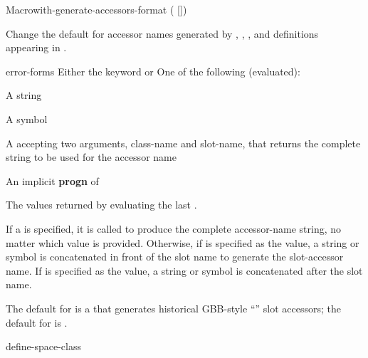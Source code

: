 \documentclass[10pt,twoside,english,pdftex]{article}
\begin{document}
\begin{functiondoc}{Macro}{with-generate-accessors-format}%
  {( [])
    \superstar{} \returns{}
    \superstar{}}

\fnsyntax

\fnpurpose Change the default for accessor names generated by
\textbf{}, \textbf{},
\textbf{}, and
\textbf{} definitions appearing in .

\fnpackage {}

\fnmodule {}

\fnargs
\begin{args}{error-forms}
\arg[format] Either the keyword  or 
 One of the following (evaluated):
\begin{tightitemize}
\item A string 
\item A symbol
\item A  accepting two arguments, class-name and slot-name,
  that returns the complete string to be used for the accessor name
\end{tightitemize}
\arg[forms] An implicit \textbf{progn} of 
\end{args}

\fnreturns The values returned by evaluating the last .

\fndescription If a   is
specified, it is called to produce the complete accessor-name string, no
matter which  value is provided.  Otherwise, if 
is specified as the  value, a string or symbol
 is concatenated in front of the slot name to
generate the slot-accessor name.  If  is specified as the
 value, a string or symbol  is
concatenated after the slot name.

The default  for  is a
 that generates historical GBB-style
``'' slot accessors; the default for
 is .

\begin{alsos}{define-space-class}
\end{alsos}


\end{functiondoc}
\end{document}
